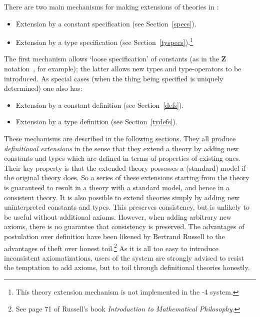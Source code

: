 There are two main mechanisms for making extensions of theories in \HOL:
\begin{itemize}

\item Extension by a constant specification   (see Section~\ref{specs}).

\item Extension by a type specification (see
Section~\ref{tyspecs}).\footnote{This theory extension mechanism is
not implemented in the \HOL{}-4 system.}

\end{itemize}
The first mechanism allows `loose specification' of constants (as in
the {\bf Z} notation~\cite{Z}, for example); the latter allows new
types and type-operators to be introduced.  As special cases (when the
thing being specified is uniquely determined) one also has:
\begin{itemize}

\item Extension by a constant definition (see Section~\ref{defs}).

\item Extension by a type definition (see Section~\ref{tydefs}).

\end{itemize}
These mechanisms are described in the following sections. They all
produce {\it definitional extensions\/} in the sense that they extend
a theory by adding new constants and types which are defined in terms
of properties of existing ones. Their key property is that the
extended theory possesses a (standard) model if the original theory
does. So a series of these extensions starting from the theory
 is guaranteed to result in a theory with a standard
model, and hence in a consistent theory. It is also possible to extend
theories simply by adding new uninterpreted constants and types. This
preserves consistency, but is unlikely to be useful without additional
axioms. However, when adding arbitrary new
axioms, there is no guarantee
that consistency is preserved. The advantages of postulation over
definition have been likened by Bertrand Russell to the advantages of
theft over honest toil.\footnote{See page 71 of Russell's book {\sl
Introduction to Mathematical Philosophy\/}.} As it is all too easy to
introduce inconsistent axiomatizations, users of the \HOL{} system are
strongly advised to resist the temptation to add axioms, but to toil
through definitional theories honestly.





